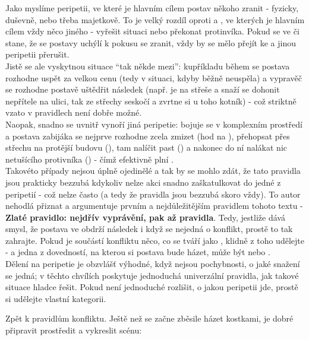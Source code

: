 \documentclass[../main.tex]{subfiles}
\begin{document}
Jako  myslíme peripetii, ve které je hlavním cílem postav někoho zranit - fyzicky, duševně, nebo třeba majetkově. To je velký rozdíl oproti  a , ve kterých je hlavním cílem vždy něco jiného - vyřešit situaci nebo překonat protinvíka. Pokud se ve  či  stane, že se postavy uchýlí k pokusu se zranit, vždy by se mělo přejít ke  a jinou peripetii přerušit.\\
Jistě se ale vyskytnou situace ``tak někde mezi'': kupříkladu během  se postava rozhodne uspět za velkou cenu (tedy v situaci, kdyby běžně neuspěla) a vypravěč se rozhodne postavě uštědřit následek (např. je na střeše a snaží se dohonit nepřítele na ulici, tak ze střechy seskočí a zvrtne si u toho kotník) - což striktně vzato v pravidlech  není dobře možné.\\
Naopak, snadno se uvnitř  vynoří jiná peripetie: bojuje se v komplexním prostředí a postava zabijáka se nejprve rozhodne zcela zmizet (hod na ), přehopsat přes střechu na protější budovu (), tam nalíčit past () a nakonec do ní nalákat nic netušícího protivníka () - čímž efektivně plní .\\
Takovéto případy nejsou úplně ojedinělé a tak by se mohlo zdát, že tato pravidla jsou prakticky bezzubá kdykoliv nelze akci snadno zaškatulkovat do jedné z peripetií - což nelze často (a tedy že pravidla jsou bezzubá skoro vždy). To autor nehodlá přiznat a argumentuje prvním a nejdůležitějším pravidlem tohoto textu - \textbf{Zlaté pravidlo: nejdřív vyprávění, pak až pravidla}. Tedy, jestliže dává smysl, že postava ve  obdrží následek i když se nejedná o konflikt, prostě to tak zahrajte. Pokud je součástí konfliktu něco, co se tváří jako , klidně z toho  udělejte - a jedna z dovedností, na kterou si postava bude házet, může být  nebo .\\

Dělení na peripetie je obzvlášť výhodné, když nejsou pochybnosti, o jaké snažení se jedná; v těchto chvílích poskytuje jednoduchá univerzální pravidla, jak takové situace hladce řešit. Pokud není jednoduché rozlišit, o jakou peripetii jde, prostě si udělejte vlastní kategorii.



Zpět k pravidlům konfliktu. Ještě než se začne zběsile házet kostkami, je dobré připravit prostředit a vykreslit scénu:
\end{document}
